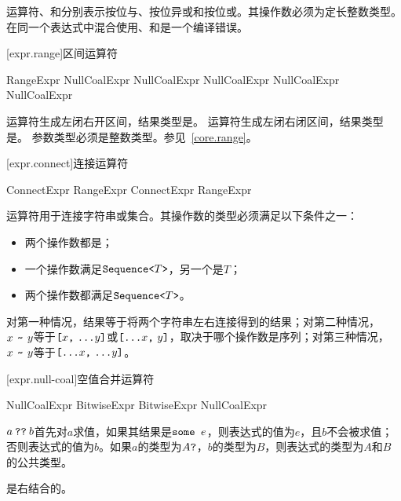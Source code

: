 \pnum
运算符、和分别表示按位与、按位异或和按位或。其操作数必须为定长整数类型。在同一个表达式中混合使用、和是一个编译错误。

[expr.range]{区间运算符}

\begin{bnf}{RangeExpr}
    NullCoalExpr \br
    NullCoalExpr  NullCoalExpr \br
    NullCoalExpr  NullCoalExpr
\end{bnf}

\pnum
运算符生成左闭右开区间，结果类型是。
运算符生成左闭右闭区间，结果类型是。
参数类型必须是整数类型。参见~\ref{core.range}。

[expr.connect]{连接运算符}

\begin{bnf}{ConnectExpr}
    RangeExpr \br
    ConnectExpr \terminal{\~} RangeExpr
\end{bnf}

\pnum
运算符\tcode{\~}用于连接字符串或集合。其操作数的类型必须满足以下条件之一：

\begin{itemize}
    \item 两个操作数都是；
    \item 一个操作数满足$\texttt{Sequence<}T\texttt{>}$，另一个是$T$；
    \item 两个操作数都满足$\texttt{Sequence<}T\texttt{>}$。
\end{itemize}

对第一种情况，结果等于将两个字符串左右连接得到的结果；对第二种情况，$x\ \tcode{\~}\ y$等于$\tcode{[}x\tcode{,}\ \tcode{...}y\tcode{]}$或$\tcode{[...}x\tcode{,}\ y\tcode{]}$，取决于哪个操作数是序列；对第三种情况，$x\ \tcode{\~}\ y$等于$\tcode{[...}x\tcode{,}\ \tcode{...}y\tcode{]}$。

[expr.null-coal]{空值合并运算符}

\begin{bnf}{NullCoalExpr}
    BitwiseExpr \br
    BitwiseExpr  NullCoalExpr
\end{bnf}

\pnum
$a\mathbin{\texttt{??}}b$首先对$a$求值，如果其结果是$\texttt{some }e$，则表达式的值为$e$，且$b$不会被求值；否则表达式的值为$b$。如果$a$的类型为$A\texttt{?}$，$b$的类型为$B$，则表达式的类型为$A$和$B$的公共类型。

\pnum
{}是右结合的。

